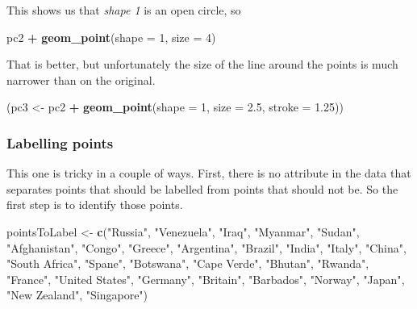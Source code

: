 \documentclass[]{book}
\newenvironment{Shaded}{\begin{snugshade}}{\end{snugshade}}
\newcommand{\KeywordTok}[1]{\textcolor[rgb]{0.13,0.29,0.53}{\textbf{#1}}}
\newcommand{\DataTypeTok}[1]{\textcolor[rgb]{0.13,0.29,0.53}{#1}}
\newcommand{\DecValTok}[1]{\textcolor[rgb]{0.00,0.00,0.81}{#1}}
\newcommand{\FloatTok}[1]{\textcolor[rgb]{0.00,0.00,0.81}{#1}}
\newcommand{\StringTok}[1]{\textcolor[rgb]{0.31,0.60,0.02}{#1}}
\newcommand{\OperatorTok}[1]{\textcolor[rgb]{0.81,0.36,0.00}{\textbf{#1}}}
\newcommand{\NormalTok}[1]{#1}
\begin{document}
This shows us that \emph{shape 1} is an open circle, so

\begin{Shaded}
\begin{Highlighting}[]
\NormalTok{pc2 }\OperatorTok{+}
\StringTok{  }\KeywordTok{geom_point}\NormalTok{(}\DataTypeTok{shape =} \DecValTok{1}\NormalTok{, }\DataTypeTok{size =} \DecValTok{4}\NormalTok{)}
\end{Highlighting}
\end{Shaded}

That is better, but unfortunately the size of the line around the points
is much narrower than on the original.

\begin{Shaded}
\begin{Highlighting}[]
\NormalTok{(pc3 <-}\StringTok{ }\NormalTok{pc2 }\OperatorTok{+}\StringTok{ }\KeywordTok{geom_point}\NormalTok{(}\DataTypeTok{shape =} \DecValTok{1}\NormalTok{, }\DataTypeTok{size =} \FloatTok{2.5}\NormalTok{, }\DataTypeTok{stroke =} \FloatTok{1.25}\NormalTok{))}
\end{Highlighting}
\end{Shaded}

\subsubsection{Labelling points}\label{labelling-points}

This one is tricky in a couple of ways. First, there is no attribute in
the data that separates points that should be labelled from points that
should not be. So the first step is to identify those points.

\begin{Shaded}
\begin{Highlighting}[]
\NormalTok{pointsToLabel <-}\StringTok{ }\KeywordTok{c}\NormalTok{(}\StringTok{"Russia"}\NormalTok{, }\StringTok{"Venezuela"}\NormalTok{, }\StringTok{"Iraq"}\NormalTok{, }\StringTok{"Myanmar"}\NormalTok{, }\StringTok{"Sudan"}\NormalTok{,}
                   \StringTok{"Afghanistan"}\NormalTok{, }\StringTok{"Congo"}\NormalTok{, }\StringTok{"Greece"}\NormalTok{, }\StringTok{"Argentina"}\NormalTok{, }\StringTok{"Brazil"}\NormalTok{,}
                   \StringTok{"India"}\NormalTok{, }\StringTok{"Italy"}\NormalTok{, }\StringTok{"China"}\NormalTok{, }\StringTok{"South Africa"}\NormalTok{, }\StringTok{"Spane"}\NormalTok{,}
                   \StringTok{"Botswana"}\NormalTok{, }\StringTok{"Cape Verde"}\NormalTok{, }\StringTok{"Bhutan"}\NormalTok{, }\StringTok{"Rwanda"}\NormalTok{, }\StringTok{"France"}\NormalTok{,}
                   \StringTok{"United States"}\NormalTok{, }\StringTok{"Germany"}\NormalTok{, }\StringTok{"Britain"}\NormalTok{, }\StringTok{"Barbados"}\NormalTok{, }\StringTok{"Norway"}\NormalTok{, }\StringTok{"Japan"}\NormalTok{,}
                   \StringTok{"New Zealand"}\NormalTok{, }\StringTok{"Singapore"}\NormalTok{)}
\end{Highlighting}
\end{Shaded}
\end{document}
